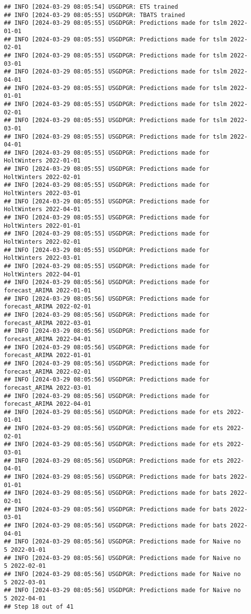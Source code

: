 \documentclass[
]{article}
\begin{document}
\begin{verbatim}
## INFO [2024-03-29 08:05:54] USGDPGR: ETS trained
## INFO [2024-03-29 08:05:55] USGDPGR: TBATS trained
## INFO [2024-03-29 08:05:55] USGDPGR: Predictions made for tslm 2022-01-01
## INFO [2024-03-29 08:05:55] USGDPGR: Predictions made for tslm 2022-02-01
## INFO [2024-03-29 08:05:55] USGDPGR: Predictions made for tslm 2022-03-01
## INFO [2024-03-29 08:05:55] USGDPGR: Predictions made for tslm 2022-04-01
## INFO [2024-03-29 08:05:55] USGDPGR: Predictions made for tslm 2022-01-01
## INFO [2024-03-29 08:05:55] USGDPGR: Predictions made for tslm 2022-02-01
## INFO [2024-03-29 08:05:55] USGDPGR: Predictions made for tslm 2022-03-01
## INFO [2024-03-29 08:05:55] USGDPGR: Predictions made for tslm 2022-04-01
## INFO [2024-03-29 08:05:55] USGDPGR: Predictions made for HoltWinters 2022-01-01
## INFO [2024-03-29 08:05:55] USGDPGR: Predictions made for HoltWinters 2022-02-01
## INFO [2024-03-29 08:05:55] USGDPGR: Predictions made for HoltWinters 2022-03-01
## INFO [2024-03-29 08:05:55] USGDPGR: Predictions made for HoltWinters 2022-04-01
## INFO [2024-03-29 08:05:55] USGDPGR: Predictions made for HoltWinters 2022-01-01
## INFO [2024-03-29 08:05:55] USGDPGR: Predictions made for HoltWinters 2022-02-01
## INFO [2024-03-29 08:05:55] USGDPGR: Predictions made for HoltWinters 2022-03-01
## INFO [2024-03-29 08:05:55] USGDPGR: Predictions made for HoltWinters 2022-04-01
## INFO [2024-03-29 08:05:56] USGDPGR: Predictions made for forecast_ARIMA 2022-01-01
## INFO [2024-03-29 08:05:56] USGDPGR: Predictions made for forecast_ARIMA 2022-02-01
## INFO [2024-03-29 08:05:56] USGDPGR: Predictions made for forecast_ARIMA 2022-03-01
## INFO [2024-03-29 08:05:56] USGDPGR: Predictions made for forecast_ARIMA 2022-04-01
## INFO [2024-03-29 08:05:56] USGDPGR: Predictions made for forecast_ARIMA 2022-01-01
## INFO [2024-03-29 08:05:56] USGDPGR: Predictions made for forecast_ARIMA 2022-02-01
## INFO [2024-03-29 08:05:56] USGDPGR: Predictions made for forecast_ARIMA 2022-03-01
## INFO [2024-03-29 08:05:56] USGDPGR: Predictions made for forecast_ARIMA 2022-04-01
## INFO [2024-03-29 08:05:56] USGDPGR: Predictions made for ets 2022-01-01
## INFO [2024-03-29 08:05:56] USGDPGR: Predictions made for ets 2022-02-01
## INFO [2024-03-29 08:05:56] USGDPGR: Predictions made for ets 2022-03-01
## INFO [2024-03-29 08:05:56] USGDPGR: Predictions made for ets 2022-04-01
## INFO [2024-03-29 08:05:56] USGDPGR: Predictions made for bats 2022-01-01
## INFO [2024-03-29 08:05:56] USGDPGR: Predictions made for bats 2022-02-01
## INFO [2024-03-29 08:05:56] USGDPGR: Predictions made for bats 2022-03-01
## INFO [2024-03-29 08:05:56] USGDPGR: Predictions made for bats 2022-04-01
## INFO [2024-03-29 08:05:56] USGDPGR: Predictions made for Naive no  5 2022-01-01
## INFO [2024-03-29 08:05:56] USGDPGR: Predictions made for Naive no  5 2022-02-01
## INFO [2024-03-29 08:05:56] USGDPGR: Predictions made for Naive no  5 2022-03-01
## INFO [2024-03-29 08:05:56] USGDPGR: Predictions made for Naive no  5 2022-04-01
## Step 18 out of 41
\end{verbatim}
\end{document}
